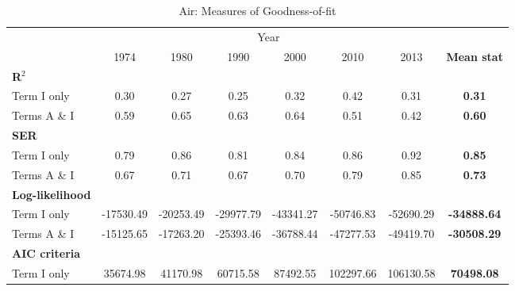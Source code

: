 \documentclass[a4paper,11pt]{article}
\begin{document}
\begin{table}[htbp]
  \centering
  \caption{Air: Measures of Goodness-of-fit}
\begin{center}
    \begin{tabular}{lccccccc}
   \hline\hline
          & \multicolumn{6}{c}{Year}                      &  \\

      & \multicolumn{1}{c}{1974} & \multicolumn{1}{c}{1980} & \multicolumn{1}{c}{1990} & \multicolumn{1}{c}{2000} & \multicolumn{1}{c}{2010} & \multicolumn{1}{c}{2013} & \multicolumn{1}{c}{\textbf{Mean stat}}\\
\hline
\textbf{R$^{2}$} & \multicolumn{1}{c}{} & \multicolumn{1}{c}{} & \multicolumn{1}{c}{} & \multicolumn{1}{c}{} & \multicolumn{1}{c}{} & \multicolumn{1}{c}{} & \multicolumn{1}{c}{\textbf{}} \\
Term I only & 0.30  & 0.27  & 0.25  & 0.32  & \multicolumn{1}{c}{0.42} & \multicolumn{1}{c}{0.31} & \multicolumn{1}{c}{\textbf{0.31}} \\
Terms A \& I & 0.59  & 0.65  & 0.63  & 0.64  & \multicolumn{1}{c}{0.51} & \multicolumn{1}{c}{0.42} & \multicolumn{1}{c}{\textbf{0.60}} \\
\textbf{SER} &       &       &       &       & \multicolumn{1}{c}{} & \multicolumn{1}{c}{} & \multicolumn{1}{c}{\textbf{}} \\
Term I only & 0.79  & 0.86  & 0.81  & 0.84  & \multicolumn{1}{c}{0.86} & \multicolumn{1}{c}{0.92} & \multicolumn{1}{c}{\textbf{0.85}} \\
Terms A \& I & 0.67  & 0.71  & 0.67  & 0.70  & \multicolumn{1}{c}{0.79} & \multicolumn{1}{c}{0.85} & \multicolumn{1}{c}{\textbf{0.73}} \\
\textbf{Log-likelihood} &       &       &       &       &       & \multicolumn{1}{c}{} & \multicolumn{1}{c}{\textbf{}} \\
Term I only & -17530.49 & -20253.49 & -29977.79 & -43341.27 & \multicolumn{1}{c}{-50746.83} & \multicolumn{1}{c}{-52690.29} & \multicolumn{1}{c}{\textbf{-34888.64}} \\
Terms A \& I & -15125.65 & -17263.20 & -25393.46 & -36788.44 & \multicolumn{1}{c}{-47277.53} & \multicolumn{1}{c}{-49419.70} & \multicolumn{1}{c}{\textbf{-30508.29}} \\
\textbf{AIC criteria} &       &       &       &       &       & \multicolumn{1}{c}{} & \multicolumn{1}{c}{\textbf{}} \\
Term I only & 35674.98 & 41170.98 & 60715.58 & 87492.55 & \multicolumn{1}{c}{102297.66} & \multicolumn{1}{c}{106130.58} & \multicolumn{1}{c}{\textbf{70498.08}} \\

\end{tabular}
\end{center}
\end{table}
\end{document}
